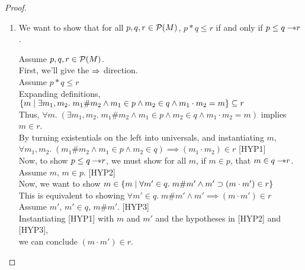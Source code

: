 \begin{proof}
\begin{enumerate}
\item We want to show that for all $p, q, r \in \mathcal{P}(M)$, $p * q \leq r$ if and
only if $p \leq q -\!\!* r$. 

  \begin{tabbedproof}
    Assume $p, q, r \in \mathcal{P}(M)$. \\
    \oo First, we'll give the $\Rightarrow$ direction. \\
    \ooo Assume $p * q \leq r$ \\
    \ooo Expanding definitions, 
          $\{{{m}\;|\;{\exists m_1, m_2.\; m_1 \# m_2 \land m_1 \in p \land m_2 \in q 
                                             \land m_1 \cdot m_2 = m}}\}
           \subseteq r$ \\
    \ooo Thus, $\forall m.\; (\exists m_1, m_2.\; m_1 \# m_2 \land m_1 \in p \land m_2 \in q 
                                             \land m_1 \cdot m_2 = m)$ implies $m \in r$. \\
    \ooo By turning existentials on the left into universals, and instantiating $m$, \\
    \oooo
             $\forall m_1, m_2.\; (m_1 \# m_2 \land m_1 \in p \land m_2 \in q) \implies (m_1 \cdot m_2) \in r$ [HYP1] \\
    \ooo Now, to show $p \leq q -\!\!* r$, we must show
         for all $m$, if $m \in p$, that $m \in q -\!\!* r$. \\
    \ooo Assume $m$, $m \in p$. [HYP2] \\
    \oooo Now, we want to show $m \in \{{{m}\;|\;{\forall m' \in q.\; m\# m' \land m' \supset (m \cdot m') \in r}}\}$ \\
    \oooo This is equivalent to showing $\forall m' \in q.\; m\# m' \land m' \implies (m \cdot m') \in r$ \\
    \oooo Assume $m'$, $m' \in q$, $m \# m'$. [HYP3] \\ 
    \ooooo Instantiating [HYP1] with $m$ and $m'$ and the hypotheses in [HYP2] and [HYP3], \\
    \ooooo we can conclude $(m \cdot m') \in r$.  \\


\end{tabbedproof}
\end{enumerate}
\end{proof}
